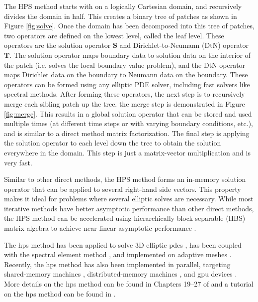 The HPS method starts with on a logically Cartesian domain, and recursively divides the domain in half. This creates a binary tree of patches as shown in Figure \ref{fig:solve}. Once the domain has been decomposed into this tree of patches, two operators are defined on the lowest level, called the leaf level. These operators are the solution operator $\textbf{S}$ and Dirichlet-to-Neumann (DtN) operator $\textbf{T}$. The solution operator maps boundary data to solution data on the interior of the patch (i.e. solves the local boundary value problem), and the DtN operator maps Dirichlet data on the boundary to Neumann data on the boundary. These operators can be formed using any elliptic PDE solver, including fast solvers like spectral methods. After forming these operators, the next step is to recursively merge each sibling patch up the tree. the merge step is demonstrated in Figure \ref{fig:merge}. This results in a global solution operator that can be stored and used multiple times (at different time steps or with varying boundary conditions, etc.), and is similar to a direct method matrix factorization. The final step is applying the solution operator to each level down the tree to obtain the solution everywhere in the domain. This step is just a matrix-vector multiplication and is very fast.

Similar to other direct methods, the HPS method forms an in-memory solution operator that can be applied to several right-hand side vectors. This property makes it ideal for problems where several elliptic solves are necessary. While most iterative methods have better asymptotic performance than other direct methods, the HPS method can be accelerated using hierarchically block separable (HBS) matrix algebra to achieve near linear asymptotic performance \citep{gillman2014direct}.

The \gls{hps} method has been applied to solve 3D elliptic \gls{pdes} \citep{hao2016direct}, has been coupled with the spectral element method \citep{fortunato2020ultraspherical}, and implemented on adaptive meshes \citep{babb2018accelerated, geldermans2019adaptive,chipman2024fast}. Recently, the \gls{hps} method has also been implemented in parallel, targeting shared-memory machines \citep{beams2020parallel}, distributed-memory machines \citep{yesypenko2022parallel}, and \gls{gpu} devices \citep{yesypenko2022gpu}. More details on the \gls{hps} method can be found in Chapters 19--27 of \citep{martinsson2019fast} and a tutorial on the \gls{hps} method can be found in \citep{martinsson2015hierarchical}.

